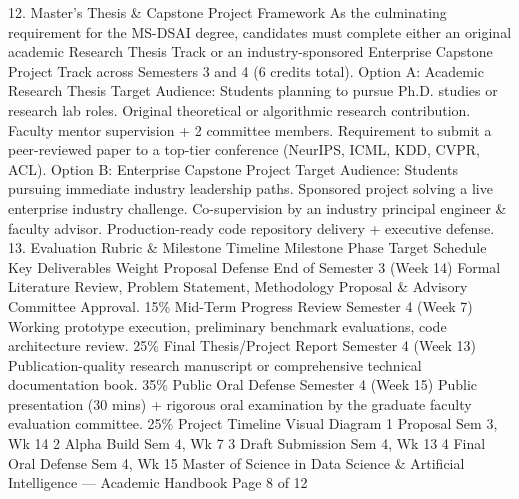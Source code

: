 12. Master's Thesis \& Capstone Project Framework
As the culminating requirement for the MS-DSAI degree, candidates must complete either an original academic
Research Thesis Track or an industry-sponsored Enterprise Capstone Project Track across Semesters 3 and 4 (6
credits total).
Option A: Academic Research Thesis
Target Audience: Students planning to pursue Ph.D.
studies or research lab roles.
Original theoretical or algorithmic research contribution.
Faculty mentor supervision + 2 committee members.
Requirement to submit a peer-reviewed paper to a top-tier
conference (NeurIPS, ICML, KDD, CVPR, ACL).
Option B: Enterprise Capstone Project
Target Audience: Students pursuing immediate industry
leadership paths.
Sponsored project solving a live enterprise industry
challenge.
Co-supervision by an industry principal engineer \& faculty
advisor.
Production-ready code repository delivery + executive
defense.
13. Evaluation Rubric \& Milestone Timeline
Milestone Phase
Target Schedule
Key Deliverables
Weight
Proposal Defense
End of Semester 3
(Week 14)
Formal Literature Review, Problem Statement, Methodology
Proposal \& Advisory Committee Approval.
15\%
Mid-Term Progress
Review
Semester 4 (Week 7)
Working prototype execution, preliminary benchmark evaluations,
code architecture review.
25\%
Final Thesis/Project
Report
Semester 4 (Week
13)
Publication-quality research manuscript or comprehensive
technical documentation book.
35\%
Public Oral Defense
Semester 4 (Week
15)
Public presentation (30 mins) + rigorous oral examination by the
graduate faculty evaluation committee.
25\%
Project Timeline Visual Diagram
1
Proposal
Sem 3, Wk 14
2
Alpha Build
Sem 4, Wk 7
3
Draft Submission
Sem 4, Wk 13
4
Final Oral Defense
Sem 4, Wk 15
Master of Science in Data Science \& Artificial Intelligence — Academic Handbook
Page 8 of 12


